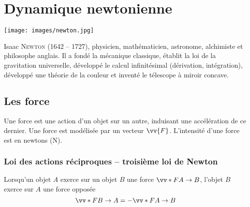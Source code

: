 \documentclass{cours}
\begin{document}
\setcounter{chapter}{10}
\chapter{Dynamique newtonienne}
\begin{minipage}{7cm}
\begin{center}
  \texttt{[image: images/newton.jpg]}
\end{center}
\end{minipage}%
\begin{minipage}{\linewidth - 7cm}
  Isaac \textsc{Newton} (1642 -- 1727), physicien, mathématicien, astronome, alchimiste et philosophe anglais. Il a fondé la mécanique classique, établit la loi de la gravitation universelle, développé le calcul infinitésimal (dérivation, intégration), développé une théorie de la couleur et inventé le télescope à miroir concave.  
\end{minipage}
\section{Les force}%
\label{sec:les_force}

Une force est une action d'un objet sur un autre, induisant une accélération de ce dernier. Une force est modélisée par un vecteur $\vv{F}$. L'intensité d'une force est en newtons (N).

\subsection{Loi des actions réciproques -- troisième loi de Newton}%
\label{sub:loi_des_actions_reciproques}

Lorsqu'un objet $A$ exerce sur un objet $B$ une force $\vv*{F}{A\rightarrow B}$, l'objet $B$ exerce sur $A$ une force opposée 
\begin{equation}
\vv*{F}{B\rightarrow A} = - \vv*{F}{A\rightarrow B}
\end{equation}

\begin{center}
\end{center}
\end{document}
